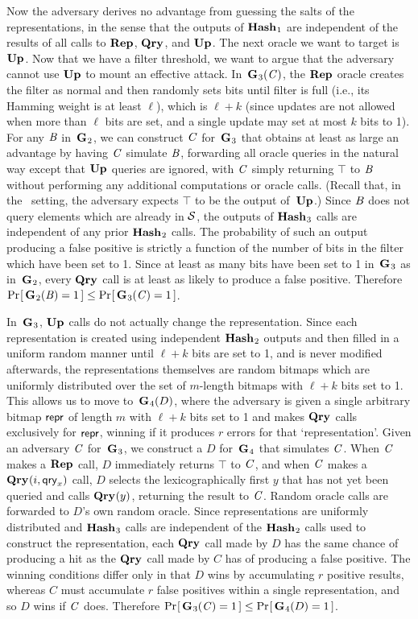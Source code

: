 Now the adversary derives no advantage from guessing the salts of the
representations, in the sense that the outputs of $\textup{\textbf{Hash}}\hspace{0.5pt}_1$ are independent of the results
of all calls to $\textup{\textbf{Rep}}\hspace{0.5pt}$, $\textup{\textbf{Qry}}\hspace{0.5pt}$, and $\textup{\textbf{Up}}\hspace{0.5pt}$. The next oracle we want to target
is $\textup{\textbf{Up}}\hspace{0.5pt}$. Now that we have a filter threshold, we want to argue that the
adversary cannot use $\textup{\textbf{Up}}\hspace{0.5pt}$ to mount an effective attack.
%
In~$\textup{\textbf{G}}\hspace{0.5pt}_3(\mathit{C})$, the $\textup{\textbf{Rep}}\hspace{0.5pt}$ oracle creates the filter as normal and then
randomly sets bits until filter is full (i.e., its Hamming weight is at least
$\ell$), which is $\ell+k$ (since
updates are not allowed when more than $\ell$ bits are set, and a single update
may set at most $k$ bits to 1). For any $\mathit{B}$ in~$\textup{\textbf{G}}\hspace{0.5pt}_2$, we can construct
$\mathit{C}$ for~$\textup{\textbf{G}}\hspace{0.5pt}_3$ that obtains at least as large an advantage by having $\mathit{C}$
simulate $\mathit{B}$, forwarding all oracle queries in the natural way except that
$\textup{\textbf{Up}}\hspace{0.5pt}$ queries are ignored, with $\mathit{C}$ simply returning $\top$ to $\mathit{B}$ without
performing any additional computations or oracle calls. (Recall that, in the
\erreps\ setting, the adversary expects $\top$ to be the output of~$\textup{\textbf{Up}}\hspace{0.5pt}$.) Since $\mathit{B}$ does not
query elements which are already in $\mathcal{S}$, the outputs of $\textup{\textbf{Hash}}\hspace{0.5pt}_3$ calls are
independent of any prior $\textup{\textbf{Hash}}\hspace{0.5pt}_2$ calls.
%
The probability of such an output producing a false positive is strictly a
function of the number of bits in the filter which have been set to 1.
%
Since at least as many bits have been set to 1 in~$\textup{\textbf{G}}\hspace{0.5pt}_3$ as in~$\textup{\textbf{G}}\hspace{0.5pt}_2$,
every $\textup{\textbf{Qry}}\hspace{0.5pt}$ call is at least as likely to produce a false positive. Therefore
$\Pr\hspace{-1pt}\left[\,\textup{\textbf{G}}\hspace{0.5pt}_2(\mathit{B}) = 1\,\right] \le \Pr\hspace{-1pt}\left[\,\textup{\textbf{G}}\hspace{0.5pt}_3(\mathit{C}) = 1\,\right]$.

In~$\textup{\textbf{G}}\hspace{0.5pt}_3$, $\textup{\textbf{Up}}\hspace{0.5pt}$ calls do not actually change the representation. Since each
representation is created using independent $\textup{\textbf{Hash}}\hspace{0.5pt}_2$ outputs and then filled
in a uniform random manner until $\ell+k$ bits are set to 1, and is never
modified afterwards, the representations
themselves are random bitmaps which are uniformly distributed over the set of
$m$-length bitmaps with $\ell+k$ bits set to 1. This allows us to move
to~$\textup{\textbf{G}}\hspace{0.5pt}_4(D)$, where the adversary is given a single arbitrary bitmap $\mathsf{repr}$
of length $m$ with $\ell+k$ bits set to 1 and makes $\textup{\textbf{Qry}}\hspace{0.5pt}$ calls exclusively
for $\mathsf{repr}$, winning if it produces $r$ errors for that `representation'. Given
an adversary $\mathit{C}$ for~$\textup{\textbf{G}}\hspace{0.5pt}_3$, we construct a $D$ for~$\textup{\textbf{G}}\hspace{0.5pt}_4$ that simulates
$\mathit{C}$. When $\mathit{C}$ makes a $\textup{\textbf{Rep}}\hspace{0.5pt}$ call, $D$ immediately returns $\top$ to $\mathit{C}$, and
when $\mathit{C}$ makes a $\textup{\textbf{Qry}}\hspace{0.5pt}(i,\mathsf{qry}_x)$ call, $D$ selects the lexicographically first
$y$ that has not yet been queried and calls $\textup{\textbf{Qry}}\hspace{0.5pt}(y)$, returning the result to
$\mathit{C}$. Random oracle calls are forwarded to $D$'s own random oracle.
Since representations are uniformly distributed and $\textup{\textbf{Hash}}\hspace{0.5pt}_3$ calls are
independent of the $\textup{\textbf{Hash}}\hspace{0.5pt}_2$ calls used to construct the representation, each
$\textup{\textbf{Qry}}\hspace{0.5pt}$ call made by $D$ has the same chance of producing a hit as the $\textup{\textbf{Qry}}\hspace{0.5pt}$
call made by $C$ has of producing a false positive.
%
The winning conditions differ
only in that $D$ wins by accumulating $r$ positive results, whereas $C$ must
accumulate $r$ false positives within a single representation, and so $D$ wins
if $\mathit{C}$ does. Therefore $\Pr\hspace{-1pt}\left[\,\textup{\textbf{G}}\hspace{0.5pt}_3(\mathit{C}) = 1\,\right] \le \Pr\hspace{-1pt}\left[\,\textup{\textbf{G}}\hspace{0.5pt}_4(D) = 1\,\right]$.

